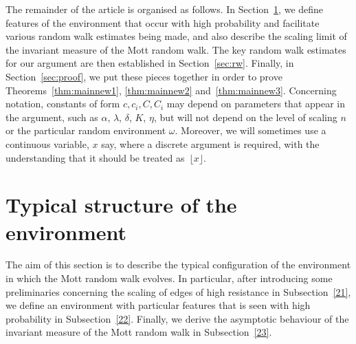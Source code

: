 \documentclass[AHL,Unicode,longabstracts,published]{cedram}
\begin{document}
The remainder of the article is organised as follows. In Section~\ref{sec:prelim}, we define features of the environment that occur with high probability and facilitate various random walk estimates being made, and also describe the scaling limit of the invariant measure of the Mott random walk. The key random walk estimates for our argument are then established in Section~\ref{sec:rw}. Finally, in Section~\ref{sec:proof}, we put these pieces together in order to prove Theorems~\ref{thm:mainnew1}, \ref{thm:mainnew2} and~\ref{thm:mainnew3}. Concerning notation, constants of form $c,c_i,C,C_i$ may depend on parameters that appear in the argument, such as $\alpha$, $\lambda$, $\delta$, $K$, $\eta$, but will not depend on the level of scaling $n$ or the particular random environment $\omega$. Moreover, we will sometimes use a continuous variable, $x$ say, where a discrete argument is required, with the understanding that it should be treated as~$\lfloor x\rfloor$.

\section{Typical structure of the environment}\label{sec:prelim}

The aim of this section is to describe the typical configuration of the environment in which the Mott random walk evolves. In particular, after introducing some preliminaries concerning the scaling of edges of high resistance in Subsection~\ref{21}, we define an environment with particular features that is seen with high probability in Subsection~\ref{22}. Finally, we derive the asymptotic behaviour of the invariant measure of the Mott random walk in Subsection~\ref{23}.
\end{document}
